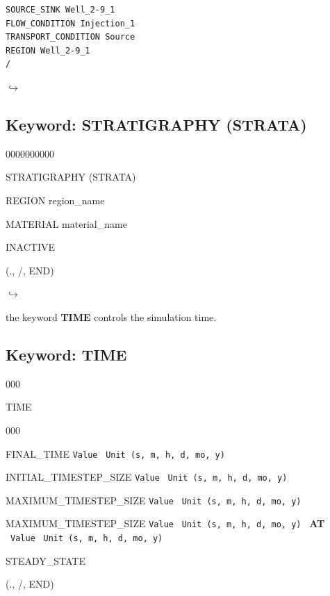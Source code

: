 \documentclass[12pt]{article}
\newcommand\return{{\hfill$\hookrightarrow$}}
\begin{document}
\begin{verbatim}
SOURCE_SINK Well_2-9_1
FLOW_CONDITION Injection_1
TRANSPORT_CONDITION Source
REGION Well_2-9_1
/
\end{verbatim}

\hyperlink{target_key}{\return}


\newpage
\protect\hypertarget{target_strata}{}

\subsection{Keyword: STRATIGRAPHY (STRATA)}
\begin{deflist}{0000000000}
\item[STRATIGRAPHY (STRATA)]
\item  REGION region\_name
\item  MATERIAL material\_name
\item  INACTIVE
\item[(., /, END)]
\end{deflist}

\hyperlink{target_key}{\return}


\newpage
\protect\hypertarget{target_time}{}

 the keyword {\bf TIME} controls the simulation time.

\subsection{Keyword: TIME}
\begin{deflist}{000}
\item[TIME] ~
\begin{deflist}{000}
\item[FINAL\_TIME] {\tt Value} \ {\tt Unit (s, m, h, d, mo, y)}
\item[INITIAL\_TIMESTEP\_SIZE] {\tt Value} \ {\tt Unit (s, m, h, d, mo, y)}
\item[MAXIMUM\_TIMESTEP\_SIZE] {\tt Value} \ {\tt Unit (s, m, h, d, mo, y)}
\item[MAXIMUM\_TIMESTEP\_SIZE] {\tt Value} \ {\tt Unit (s, m, h, d, mo, y)} \ {\bf AT} \ {\tt Value} \ {\tt Unit (s, m, h, d, mo, y)}
\item[STEADY\_STATE]
\end{deflist}
\item[(., /, END)]
\end{deflist}
\end{document}
